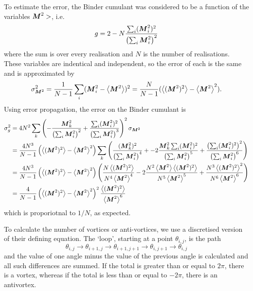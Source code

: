 To estimate the error, the Binder cumulant was considered to be a function of the variables $ \boldsymbol{M}^2 >$, i.e.
\[
g = 2 - N \frac{\sum_i (\boldsymbol{M}^2_i)^2}{\left ( \sum_i \boldsymbol{M}^2_i\right)^2}
\]
where the sum is over every realisation and $N$ is the number of realisations. These variables are indentical and independent, so the error of each is the same and is approximated by 
\[
\sigma^2_{\boldsymbol{M}^2} = \frac{1}{N-1} \sum_i (\boldsymbol{M}^2_i - \left < \boldsymbol{M}^2 \right>)^2 = \frac{N}{N-1} (\left< (\boldsymbol{M}^2)^2 \right > - \left < \boldsymbol{M}^2\right>^2).
\] 
Using error propagation, the error on the Binder cumulant is 
\[
\begin{split}
\sigma_g^2 &= 4N^2 \sum_k \left( -\frac{\boldsymbol{M}^2_k}{\left ( \sum_i \boldsymbol{M}^2_i  \right )^2} + \frac{\sum_i (\boldsymbol{M}^2_i)^2}{\left(\sum_i \boldsymbol{M}^2_i \right)^3} \right)^2 \sigma_{\boldsymbol{M}^2} \\
	   &= \frac{4N^3}{N-1}\left(\left <(\boldsymbol{M}^2)^2 \right >   - \left<\boldsymbol{M}^2\right>^2 \right) \sum_k \left(\frac{(\boldsymbol{M}_k^2)^2}{\left(\sum_i \boldsymbol{M}_i^2 \right)^4} + -2\dfrac{\boldsymbol{M}_k^2 \sum_i (\boldsymbol{M}_i^2)^2}{\left(\sum_i \boldsymbol{M}_i^2\right)^5} + \dfrac{\left(\sum_i(\boldsymbol{M}_i^2)^2\right)^2}{\left(\sum_i \boldsymbol{M}_i^2 \right)^6}\right) \\
	&= \frac{4N^3}{N-1} \left(\left <(\boldsymbol{M}^2)^2 \right >   - \left<\boldsymbol{M}^2\right>^2 \right) \left(\frac{N \left<(\boldsymbol{M}^2)^2 \right>}{N^4 \left<\boldsymbol{M}^2 \right>^4} - 2\frac{N^2 \left< \boldsymbol{M}^2 \right> \left< (\boldsymbol{M}^2)^2 \right>}{N^5 \left<\boldsymbol{M}^2 \right>^5} + \frac{N^3\left<(\boldsymbol{M}^2)^2\right>^2}{N^6\left<\boldsymbol{M}^2\right>^6} \right) \\
	&= 
	\frac{4}{N-1} \left(\left <(\boldsymbol{M}^2)^2 \right >   - \left<\boldsymbol{M}^2\right>^2 \right)^2 \frac{\left<(\boldsymbol{M}^2)^2 \right>}{\left < \boldsymbol{M}^2\right>^6}
\end{split}
\]
which is proporiotnal to $1/N$, as expected. 

To calculate the number of vortices or anti-vortices, we use a discretised version of their defining equation. The `loop', starting at a point $\theta_{i,j}$, is the path
\[
\theta_{i,j} \to \theta_{i+1,j} \to \theta_{i+1,j+1} \to \theta_{i,j+1} \to \theta_{i,j}
\]
and the value of one angle minus the value of the previous angle is calculated and all such differences are summed. If the total is greater than or equal to $2 \pi$, there is a vortex, whereas if the total is less than or equal to $-2 \pi$, there is an antivortex.

